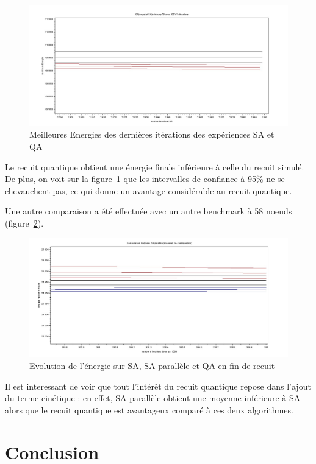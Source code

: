 \documentclass{article}%
\begin{document}
	\begin{figure}[ht]
	
	\begin{center}
	\includegraphics[scale=0.25]{zoom_pr76.jpg}
	\caption{Meilleures Energies des dernières itérations des expériences SA et QA}
	\label{fin}

	\end{center}
		
	\end{figure}
	
		Le recuit quantique obtient une énergie finale inférieure à celle du recuit simulé. De plus, on voit sur la figure~\ref{fin} que les intervalles de confiance à 95\% ne se chevauchent pas, ce qui donne un avantage considérable au recuit quantique.
		
		Une autre comparaison a été effectuée avec un autre benchmark à 58 noeuds (figure~\ref{comparaison}).
	
	\begin{figure}[!ht]
		
	\begin{center}
	\includegraphics[scale=0.25]{brazil58_zoom.jpg}
	\caption{Evolution de l'énergie sur SA, SA parallèle et QA en fin de recuit}
	\label{comparaison}
	\end{center}
	\end{figure}
	
		Il est interessant de voir que tout l'intérêt du recuit quantique repose dans l'ajout du terme cinétique : en effet, SA parallèle obtient une moyenne inférieure à SA alors que le recuit quantique est avantageux comparé à ces deux algorithmes.
		

\clearpage	
\section*{Conclusion}

\clearpage	
\listoffigures
\listofalgorithms

\end{document}
